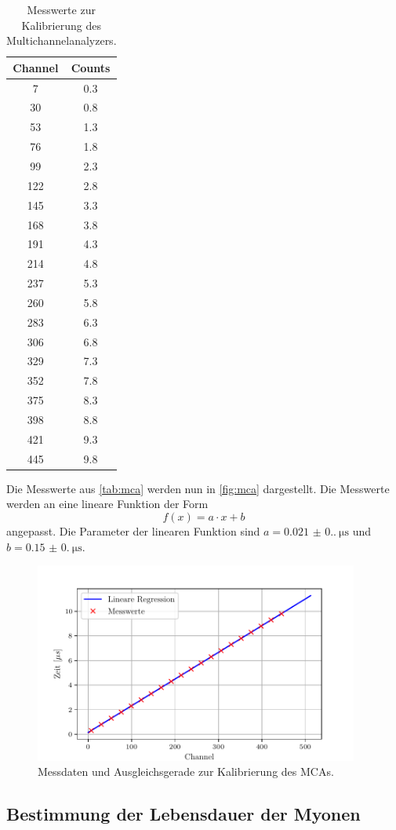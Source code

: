 \begin{table}[H]
  \centering
  \caption{Messwerte zur Kalibrierung des Multichannelanalyzers.}
  \label{tab:mca}
  \begin{tabular}{c|c}
    \hline
    \textbf{Channel} & \textbf{Counts} \\
    \hline
    7 & 0.3\\
    30 & 0.8\\
    53 & 1.3\\
    76 & 1.8\\
    99 & 2.3\\
    122 & 2.8\\
    145 & 3.3\\
    168 & 3.8\\
    191 & 4.3\\
    214 & 4.8\\
    237 & 5.3\\
    260 & 5.8\\
    283 & 6.3\\
    306 & 6.8\\
    329 & 7.3\\
    352 & 7.8\\
    375 & 8.3\\
    398 & 8.8\\
    421 & 9.3\\
    445 & 9.8
  \end{tabular}
\end{table}

Die Messwerte aus \autoref{tab:mca} werden nun in \autoref{fig:mca} dargestellt. Die Messwerte werden an eine lineare Funktion der Form
\begin{equation*}
  f(x) = a \cdot x + b
\end{equation*}
angepasst. Die Parameter der linearen Funktion sind $a = \SI{0.021(0.00)}{\micro\s}$ und $b = \SI{0.15(0.00)}{\micro\s}$.

\begin{figure}[H]
  \centering
  \includegraphics[width=0.95\textwidth]{build/mca.pdf}
  \caption{Messdaten und Ausgleichsgerade zur Kalibrierung des MCAs.}
  \label{fig:mca}
\end{figure}

\subsection{Bestimmung der Lebensdauer der Myonen}


\newpage